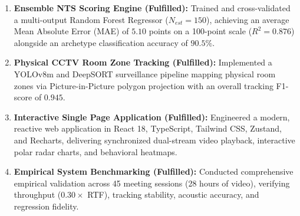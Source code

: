 \documentclass[12pt,a4paper,oneside]{report}
\begin{document}
\begin{enumerate}
    \item \textbf{Ensemble NTS Scoring Engine (Fulfilled):} Trained and cross-validated a multi-output Random Forest Regressor ($N_{est}=150$), achieving an average Mean Absolute Error (MAE) of $5.10$ points on a 100-point scale ($R^2 = 0.876$) alongside an archetype classification accuracy of $90.5\%$.
    \item \textbf{Physical CCTV Room Zone Tracking (Fulfilled):} Implemented a YOLOv8m and DeepSORT surveillance pipeline mapping physical room zones via Picture-in-Picture polygon projection with an overall tracking F1-score of $0.945$.
    \item \textbf{Interactive Single Page Application (Fulfilled):} Engineered a modern, reactive web application in React 18, TypeScript, Tailwind CSS, Zustand, and Recharts, delivering synchronized dual-stream video playback, interactive polar radar charts, and behavioral heatmaps.
    \item \textbf{Empirical System Benchmarking (Fulfilled):} Conducted comprehensive empirical validation across 45 meeting sessions (28 hours of video), verifying throughput ($0.30\times$ RTF), tracking stability, acoustic accuracy, and regression fidelity.
\end{enumerate}
\end{document}
